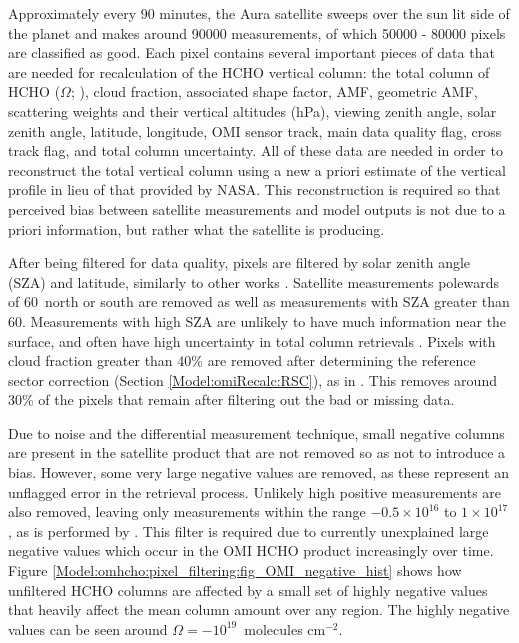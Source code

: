     Approximately every $90$ minutes, the Aura satellite sweeps over the sun lit side of the planet and makes around 90000 measurements, of which 50000 - 80000 pixels are classified as good.
    Each pixel contains several important pieces of data that are needed for recalculation of the HCHO vertical column: the total column of HCHO ($\Omega$; \moleccm), cloud fraction, associated shape factor, AMF, geometric AMF, scattering weights and their vertical altitudes (hPa), viewing zenith angle, solar zenith angle, latitude, longitude, OMI sensor track, main data quality flag, cross track flag, and total column uncertainty.
    All of these data are needed in order to reconstruct the total vertical column using a new a priori estimate of the vertical profile in lieu of that provided by NASA.
    This reconstruction is required so that perceived bias between satellite measurements and model outputs is not due to a priori information, but rather what the satellite is producing.
    
    After being filtered for data quality, pixels are filtered by solar zenith angle (SZA) and latitude, similarly to other works \parencite[e.g.,][]{Marais2012, Barkley2013, Zhu2014, Bauwens2016, Zhu2016}.
    Satellite measurements polewards of 60\degr ~north or south are removed as well as measurements with SZA greater than 60\degr.
    Measurements with high SZA are unlikely to have much information near the surface, and often have high uncertainty in total column retrievals \parencite[e.g.,][]{Stone2015}.
    Pixels with cloud fraction greater than 40\% are removed after determining the reference sector correction (Section \ref{Model:omiRecalc:RSC}), as in \textcite{Abad2015, DeSmedt2015}.
    This removes around 30\% of the pixels that remain after filtering out the bad or missing data.

    Due to noise and the differential measurement technique, small negative columns are present in the satellite product that are not removed so as not to introduce a bias.
    However, some very large negative values are removed, as these represent an unflagged error in the retrieval process.
    Unlikely high positive measurements are also removed, leaving only measurements within the range $-0.5 \times 10^{16}$ to $1 \times 10^{17} $\moleccm, as is performed by \textcite{Zhu2016}.
    This filter is required due to currently unexplained large negative values which occur in the OMI HCHO product increasingly over time.
    Figure \ref{Model:omhcho:pixel_filtering:fig_OMI_negative_hist} shows how unfiltered HCHO columns are affected by a small set of highly negative values that heavily affect the mean column amount over any region.
    The highly negative values can be seen around $\Omega = -10^{19}$~molecules cm$^{-2}$.
    
